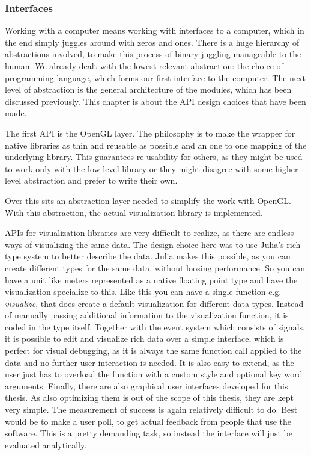 \subsubsection{Interfaces}

Working with a computer means working with interfaces to a computer, which in the end simply juggles around with zeros and ones. There is a huge hierarchy of abstractions involved, to make this process of binary juggling manageable to the human.
We already dealt with the lowest relevant abstraction: the choice of programming language, which forms our first interface to the computer.
The next level of abstraction is the general architecture of the modules, which has been discussed previously. 
This chapter is about the API design choices that have been made.

The first API is the \ac{OpenGL} layer. 
The philosophy is to make the wrapper for native libraries as thin and reusable as possible and an one to one mapping of the underlying library.
This guarantees re-usability for others, as they might be used to work only with the low-level library or they might disagree with some higher-level abstraction and prefer to write their own.

Over this sits an abstraction layer needed to simplify the work with \ac{OpenGL}.
With this abstraction, the actual visualization library is implemented.

\ac{API}s for visualization libraries are very difficult to realize, as there are endless ways of visualizing the same data.
The design choice here was to use Julia's rich type system to better describe the data. 
Julia makes this possible, as you can create different types for the same data, without loosing performance.
So you can have a unit like meters represented as a native floating point type and have the visualization specialize to this.
Like this you can have a single function e.g. \textit{visualize}, that does create a default visualization for different data types. Instead of manually passing additional information to the visualization function, it is coded in the type itself.
Together with the event system which consists of signals, it is possible to edit and visualize rich data over a simple interface, which is perfect for visual debugging, as it is always the same function call applied to the data and no further user interaction is needed.
It is also easy to extend, as the user just has to overload the function with a custom style and optional key word arguments.
Finally, there are also graphical user interfaces developed for this thesis. As also optimizing them is out of the scope of this thesis, they are kept very simple.
The measurement of success is again relatively difficult to do.
Best would be to make a user poll, to get actual feedback from people that use the software. This is a pretty demanding task, so instead the interface will just be evaluated analytically.




